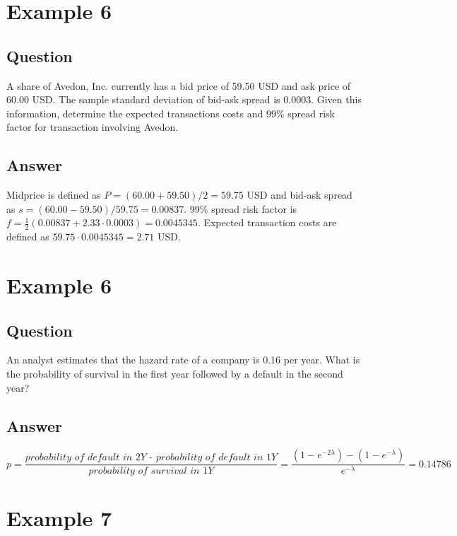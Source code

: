 \section{Example 6}

\subsection{Question}
A share of Avedon, Inc. currently has a bid price of 59.50 USD and ask price of 60.00 USD. The sample standard deviation of bid-ask spread is 0.0003. Given this information, determine the expected transactions costs and 99\% spread risk factor for transaction involving Avedon.

\subsection{Answer}
Midprice is defined as $P = (60.00 + 59.50) / 2 = 59.75$ USD and bid-ask spread as $s = (60.00 - 59.50) / 59.75 = 0.00837$. 99\% spread risk factor is $f = \frac{1}{2}(0.00837 + 2.33 \cdot 0.0003) = 0.0045345$. Expected transaction costs are defined as $59.75 \cdot 0.0045345 = 2.71$ USD.

\section{Example 6}

\subsection{Question}
An analyst estimates that the hazard rate of a company is 0.16 per year. What is the probability of survival in the first year followed by a default in the second year?

\subsection{Answer}
\begin{equation*}
p = \frac{\textit{probability of default in 2Y - probability of default in 1Y}}{\textit{probability of survival in 1Y}} = \frac{(1 - e^{-2 \lambda}) - (1 - e^{-\lambda})}{e^{-\lambda}} = 0.14786
\end{equation*}

\section{Example 7}


